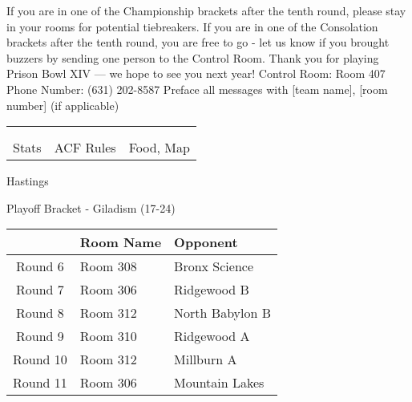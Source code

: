 \documentclass{article}%
\begin{document}
\vspace*{30pt}%
\linebreak%
If you are in one of the Championship brackets after the tenth round, please stay in your rooms for potential tiebreakers.\newline%
\newline%
If you are in one of the Consolation brackets after the tenth round, you are free to go {-} let us know if you brought buzzers by sending one person to the Control Room.\newline%
\newline%
Thank you for playing Prison Bowl XIV — we hope to see you next year!\newline%
\newline%
Control Room: Room 407\newline%
Phone Number: (631) 202{-}8587\newline%
Preface all messages with {[}team name{]}, {[}room number{]} (if applicable)%
\vspace*{30pt}%
\newline%
%
\begin{tabularx}{\textwidth}{YYY}%
  &  &  \\%
\\%
Stats&ACF Rules&Food, Map\\%
\end{tabularx}%
\newpage%
\begin{center}%
\begin{Huge}%
Hastings%
\end{Huge}%
\vspace*{12pt}%
\linebreak%
\begin{Large}%
Playoff Bracket {-} Giladism (17{-}24)%
\end{Large}%
\end{center}%
\vspace*{4pt}%
%
\begin{tabularx}{\textwidth}{|c|Y|Y|}%
\hline%
&Room Name&Opponent\\%
\hline%
Round 6&Room 308&Bronx Science\\%
Round 7&Room 306&Ridgewood B\\%
Round 8&Room 312&North Babylon B\\%
Round 9&Room 310&Ridgewood A\\%
Round 10&Room 312&Millburn A\\%
Round 11&Room 306&Mountain Lakes\\%
\hline%
\end{tabularx}%
\end{document}
